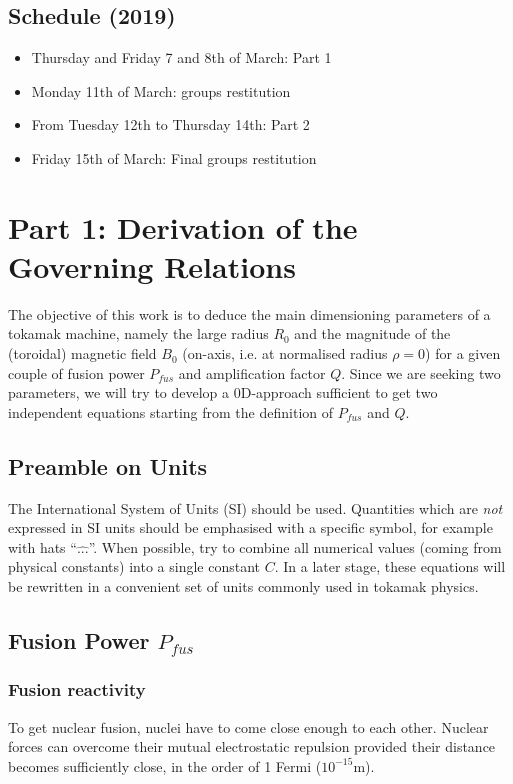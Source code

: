 \subsection{Schedule (2019)}
\begin{itemize}
\item Thursday and Friday 7 and 8th of March: Part 1
\item Monday 11th of March: groups restitution
\item From Tuesday 12th to Thursday 14th: Part 2
\item Friday 15th of March: Final groups restitution
\end{itemize}

\section{Part 1: Derivation of the Governing Relations}
The objective of this work is to deduce the main dimensioning parameters of a tokamak machine, namely the large radius $R_0$ and the magnitude of the (toroidal) magnetic field $B_0$ (on-axis, i.e. at normalised radius $\rho=0$) for a given couple of fusion power $P_{fus}$ and amplification factor $Q$. Since we are seeking two parameters, we will try to develop a 0D-approach sufficient to get two independent equations starting from the definition of $P_{fus}$ and $Q$. 

\subsection{Preamble on Units}
The International System of Units (SI) should be used. Quantities which are \emph{not} expressed in SI units should be emphasised with a specific symbol, for example with hats ``$\hat{...}$''. When possible, try to combine all numerical values (coming from physical constants) into a single constant $C$. In a later stage, these equations will be rewritten in a convenient set of units commonly used in tokamak physics.

\subsection{Fusion Power $P_{fus}$}
\subsubsection{Fusion reactivity}
To get nuclear fusion, nuclei have to come close enough to each other. Nuclear forces can overcome their mutual electrostatic repulsion provided their distance becomes sufficiently close, in the order of 1 Fermi ($10^{-15}$m). %

